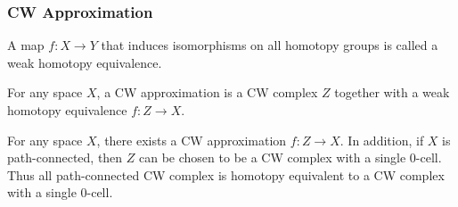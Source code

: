 \subsubsection{CW Approximation}
\begin{definition}
    A map $f:X\to Y$ that induces isomorphisms on all homotopy groups is called a weak homotopy equivalence.
\end{definition}
\begin{definition}[CW approximation]
    For any space $X$, a CW approximation is a CW complex $Z$ together with a weak homotopy equivalence $f:Z\to X$.
\end{definition}
\begin{theorem}
    For any space $X$, there exists a CW approximation $f:Z\to X$. In addition, if $X$ is path-connected, then $Z$ can be chosen to be a CW complex 
    with a single 0-cell. Thus all path-connected CW complex is homotopy equivalent to a CW complex with a single 0-cell.
\end{theorem}